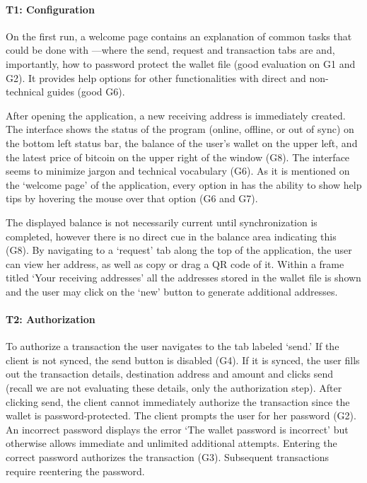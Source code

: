 \paragraph{T1: Configuration} 

On the first run, a welcome page contains an explanation of common tasks that could be done with \multibit---where the send, request and transaction tabs are and, importantly, how to password protect the wallet file (good evaluation on G1 and G2). It provides help options for other functionalities with direct and non-technical guides (good G6). 

After opening the application, a new receiving address is immediately created. The interface shows the status of the program (online, offline, or out of sync) on the bottom left status bar, the balance of the user's wallet on the upper left, and the latest price of bitcoin on the upper right of the window (G8). The interface seems to minimize jargon and technical vocabulary (G6). As it is mentioned on the `welcome page' of the application, every option in \multibit has the ability to show help tips by hovering the mouse over that option (G6 and G7).

The displayed balance is not necessarily current until synchronization is completed, however there is no direct cue in the balance area indicating this (G8). By navigating to a `request' tab along the top of the application, the user can view her address, as well as copy or drag a QR code of it. Within a frame titled `Your receiving addresses' all the addresses stored in the wallet file is shown and the user may click on the `new' button to generate additional addresses. 

\paragraph{T2: Authorization}

To authorize a transaction the user navigates to the tab labeled `send.' If the client is not synced, the send button is disabled (G4). If it is synced, the user fills out the transaction details, destination address and amount and clicks send (recall we are not evaluating these details, only the authorization step). After clicking send, the client cannot immediately authorize the transaction since the wallet is password-protected. The client prompts the user for her password (G2). An incorrect password displays the error `The wallet password is incorrect' but otherwise allows immediate and unlimited additional attempts. Entering the correct password authorizes the transaction (G3). Subsequent transactions require reentering the password.

